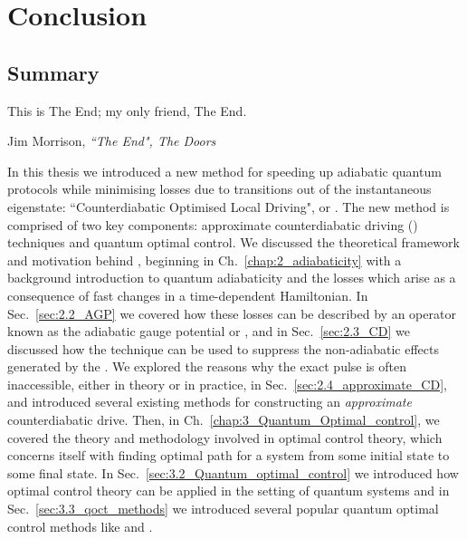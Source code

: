 \part{Conclusion}\label{part:conclusion}

\chapter{Summary}\label{chap:8_Summary}

\epigraph{This is The End; my only friend, The End.}{Jim Morrison,
\emph{``The End", The Doors}}

In this thesis we introduced a new method for speeding up adiabatic quantum protocols while minimising losses due to transitions out of the instantaneous eigenstate: ``Counterdiabatic Optimised Local Driving", or . The new method is comprised of two key components: approximate counterdiabatic driving () techniques and quantum optimal control. We discussed the theoretical framework and motivation behind , beginning in Ch.~\ref{chap:2_adiabaticity} with a background introduction to quantum adiabaticity and the losses which arise as a consequence of fast changes in a time-dependent Hamiltonian. In Sec.~\ref{sec:2.2_AGP} we covered how these losses can be described by an operator known as the adiabatic gauge potential or  \cite{kolodrubetz_geometry_2017}, and in Sec.~\ref{sec:2.3_CD} we discussed how the  technique can be used to suppress the non-adiabatic effects generated by the  \cite{berry_transitionless_2009, demirplak_adiabatic_2003}. We explored the reasons why the exact  pulse is often inaccessible, either in theory or in practice, in Sec.~\ref{sec:2.4_approximate_CD}, and introduced several existing methods for constructing an \emph{approximate} counterdiabatic drive. Then, in Ch.~\ref{chap:3_Quantum_Optimal_control}, we covered the theory and methodology involved in optimal control theory, which concerns itself with finding optimal path for a system from some initial state to some final state. In Sec.~\ref{sec:3.2_Quantum_optimal_control} we introduced how optimal control theory can be applied in the setting of quantum systems and in Sec.~\ref{sec:3.3_qoct_methods} we introduced several popular quantum optimal control methods like  and . 

